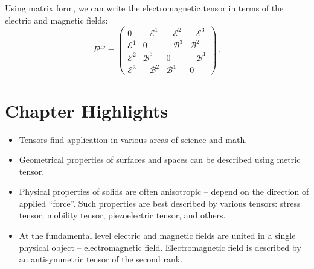 Using matrix form, we can write the electromagnetic tensor in terms
of the electric and magnetic fields:
\[
F^{\mu\nu}=
\begin{pmatrix}
  0 & -\mathcal{E}^1 & -\mathcal{E}^2 & -\mathcal{E}^3\\
  \mathcal{E}^1 & 0 & -\mathcal{B}^3 & \mathcal{B}^2\\
  \mathcal{E}^2 & \mathcal{B}^3 & 0 & -\mathcal{B}^1\\
  \mathcal{E}^3 & -\mathcal{B}^2 & \mathcal{B}^1 & 0
\end{pmatrix}\,.
\]


\section*{Chapter Highlights}
{\chhc
  \it
\begin{itemize}
\item Tensors find application in various areas of science and math.
\item Geometrical properties of surfaces and spaces can be described
  using metric tensor.
\item Physical properties of solids are often anisotropic -- depend on
  the direction of applied ``force''. Such properties are best
  described by various tensors: stress tensor, mobility tensor,
  piezoelectric tensor, and others.
\item At the fundamental level electric and magnetic fields are united
  in a single physical object -- electromagnetic field. Electromagnetic
  field is described by an antisymmetric tensor of the second rank.
\end{itemize}

}
